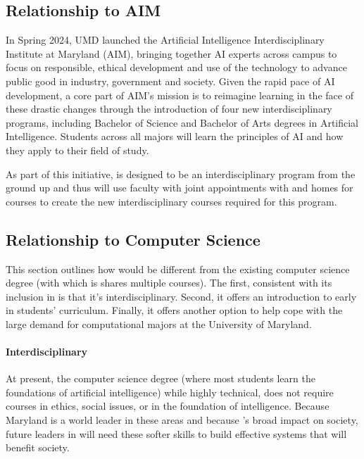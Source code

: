 
\subsection{Relationship to AIM}

In Spring 2024, UMD launched the Artificial Intelligence Interdisciplinary Institute at Maryland (AIM), bringing together AI experts across campus to focus on responsible, ethical development and use of the technology to advance public good in industry, government and society. Given the rapid pace of AI development, a core part of AIM’s mission is to reimagine learning in the face of these drastic changes through the introduction of four new interdisciplinary programs, including Bachelor of Science and Bachelor of Arts degrees in Artificial Intelligence. Students across all majors will learn the principles of AI and how they apply to their field of study.

As part of this initiative, \short{} is designed to be an interdisciplinary program from the
ground up and thus will use faculty with joint appointments with
\aim{} and homes for courses to create the new interdisciplinary
courses required for this program.


\subsection{Relationship to Computer Science}

This section outlines how \short{} would be different from the existing computer science degree (with which is shares multiple courses).  The first, consistent with its inclusion in \aim{} is that it's interdisciplinary.  Second, it offers an introduction to  early in students' curriculum.  Finally, it offers another option to help cope with the large demand for computational majors at the University of Maryland.

\paragraph{Interdisciplinary}

At present, the computer science degree (where most students learn the foundations of artificial intelligence) while highly technical, does not require courses in ethics, social issues, or in the foundation of intelligence.
%
Because Maryland is a world leader in these areas and because 's broad impact on society, future leaders in  will need these softer skills to build effective systems that will benefit society.

